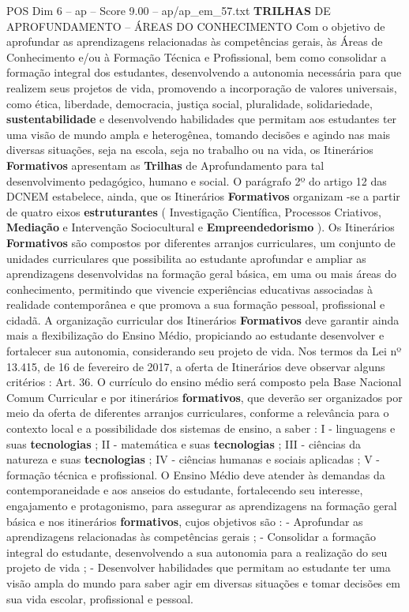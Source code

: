 \begin{textsample}{POS Dim 6 – ap – Score 9.00 – ap/ap\_em\_57.txt}  \label{ex:f6_pos_106}
\textbf{TRILHAS} DE APROFUNDAMENTO – ÁREAS DO CONHECIMENTO Com o objetivo de aprofundar as aprendizagens relacionadas às competências gerais, às Áreas de Conhecimento e/ou à Formação Técnica e Profissional, bem como consolidar a formação integral dos estudantes, desenvolvendo a autonomia necessária para que realizem seus projetos de vida, promovendo a incorporação de valores universais, como ética, liberdade, democracia, justiça social, pluralidade, solidariedade, \textbf{sustentabilidade} e desenvolvendo habilidades que permitam aos estudantes ter uma visão de mundo ampla e heterogênea, tomando decisões e agindo nas mais diversas situações, seja na escola, seja no trabalho ou na vida, os Itinerários \textbf{Formativos} apresentam as \textbf{Trilhas} de Aprofundamento para tal desenvolvimento pedagógico, humano e social.
O parágrafo 2º do artigo 12 das DCNEM estabelece, ainda, que os Itinerários \textbf{Formativos} organizam -se a partir de quatro eixos \textbf{estruturantes} ( Investigação Científica, Processos Criativos, \textbf{Mediação} e Intervenção Sociocultural e \textbf{Empreendedorismo} ).
Os Itinerários \textbf{Formativos} são compostos por diferentes arranjos curriculares, um conjunto de unidades curriculares que possibilita ao estudante aprofundar e ampliar as aprendizagens desenvolvidas na formação geral básica, em uma ou mais áreas do conhecimento, permitindo que vivencie experiências educativas associadas à realidade contemporânea e que promova a sua formação pessoal, profissional e cidadã.
A organização curricular dos Itinerários \textbf{Formativos} deve garantir ainda mais a flexibilização do Ensino Médio, propiciando ao estudante desenvolver e fortalecer sua autonomia, considerando seu projeto de vida.
Nos termos da Lei nº 13.415, de 16 de fevereiro de 2017, a oferta de Itinerários deve observar alguns critérios : Art. 36.
O currículo do ensino médio será composto pela Base Nacional Comum Curricular e por itinerários \textbf{formativos}, que deverão ser organizados por meio da oferta de diferentes arranjos curriculares, conforme a relevância para o contexto local e a possibilidade dos sistemas de ensino, a saber : I - linguagens e suas \textbf{tecnologias} ; II - matemática e suas \textbf{tecnologias} ; III - ciências da natureza e suas \textbf{tecnologias} ; IV - ciências humanas e sociais aplicadas ; V - formação técnica e profissional.
O Ensino Médio deve atender às demandas da contemporaneidade e aos anseios do estudante, fortalecendo seu interesse, engajamento e protagonismo, para assegurar as aprendizagens na formação geral básica e nos itinerários \textbf{formativos}, cujos objetivos são : - Aprofundar as aprendizagens relacionadas às competências gerais ; - Consolidar a formação integral do estudante, desenvolvendo a sua autonomia para a realização do seu projeto de vida ; - Desenvolver habilidades que permitam ao estudante ter uma visão ampla do mundo para saber agir em diversas situações e tomar decisões em sua vida escolar, profissional e pessoal.

\end{textsample}
